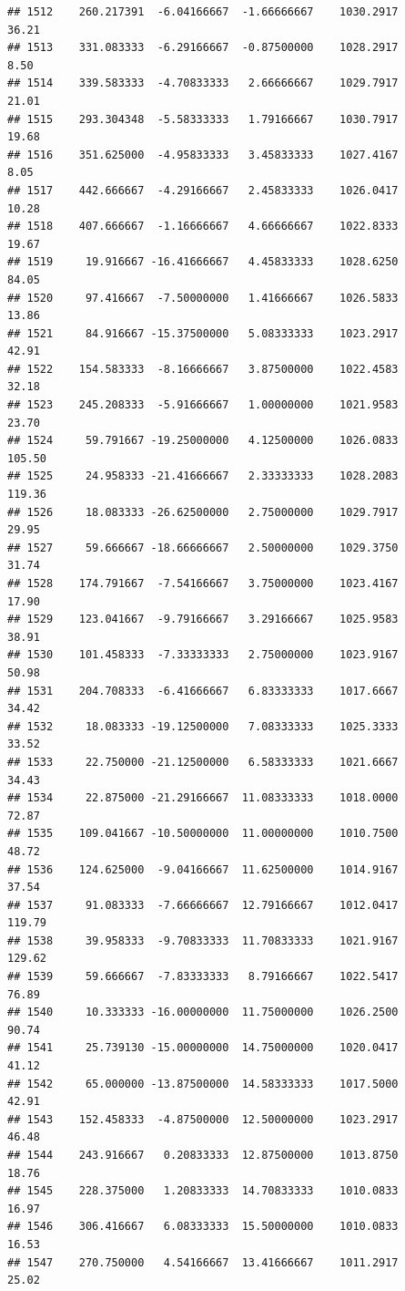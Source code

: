 \documentclass[
]{article}
\begin{document}
\begin{verbatim}
## 1512    260.217391  -6.04166667  -1.66666667    1030.2917       36.21
## 1513    331.083333  -6.29166667  -0.87500000    1028.2917        8.50
## 1514    339.583333  -4.70833333   2.66666667    1029.7917       21.01
## 1515    293.304348  -5.58333333   1.79166667    1030.7917       19.68
## 1516    351.625000  -4.95833333   3.45833333    1027.4167        8.05
## 1517    442.666667  -4.29166667   2.45833333    1026.0417       10.28
## 1518    407.666667  -1.16666667   4.66666667    1022.8333       19.67
## 1519     19.916667 -16.41666667   4.45833333    1028.6250       84.05
## 1520     97.416667  -7.50000000   1.41666667    1026.5833       13.86
## 1521     84.916667 -15.37500000   5.08333333    1023.2917       42.91
## 1522    154.583333  -8.16666667   3.87500000    1022.4583       32.18
## 1523    245.208333  -5.91666667   1.00000000    1021.9583       23.70
## 1524     59.791667 -19.25000000   4.12500000    1026.0833      105.50
## 1525     24.958333 -21.41666667   2.33333333    1028.2083      119.36
## 1526     18.083333 -26.62500000   2.75000000    1029.7917       29.95
## 1527     59.666667 -18.66666667   2.50000000    1029.3750       31.74
## 1528    174.791667  -7.54166667   3.75000000    1023.4167       17.90
## 1529    123.041667  -9.79166667   3.29166667    1025.9583       38.91
## 1530    101.458333  -7.33333333   2.75000000    1023.9167       50.98
## 1531    204.708333  -6.41666667   6.83333333    1017.6667       34.42
## 1532     18.083333 -19.12500000   7.08333333    1025.3333       33.52
## 1533     22.750000 -21.12500000   6.58333333    1021.6667       34.43
## 1534     22.875000 -21.29166667  11.08333333    1018.0000       72.87
## 1535    109.041667 -10.50000000  11.00000000    1010.7500       48.72
## 1536    124.625000  -9.04166667  11.62500000    1014.9167       37.54
## 1537     91.083333  -7.66666667  12.79166667    1012.0417      119.79
## 1538     39.958333  -9.70833333  11.70833333    1021.9167      129.62
## 1539     59.666667  -7.83333333   8.79166667    1022.5417       76.89
## 1540     10.333333 -16.00000000  11.75000000    1026.2500       90.74
## 1541     25.739130 -15.00000000  14.75000000    1020.0417       41.12
## 1542     65.000000 -13.87500000  14.58333333    1017.5000       42.91
## 1543    152.458333  -4.87500000  12.50000000    1023.2917       46.48
## 1544    243.916667   0.20833333  12.87500000    1013.8750       18.76
## 1545    228.375000   1.20833333  14.70833333    1010.0833       16.97
## 1546    306.416667   6.08333333  15.50000000    1010.0833       16.53
## 1547    270.750000   4.54166667  13.41666667    1011.2917       25.02

\end{verbatim}
\end{document}
